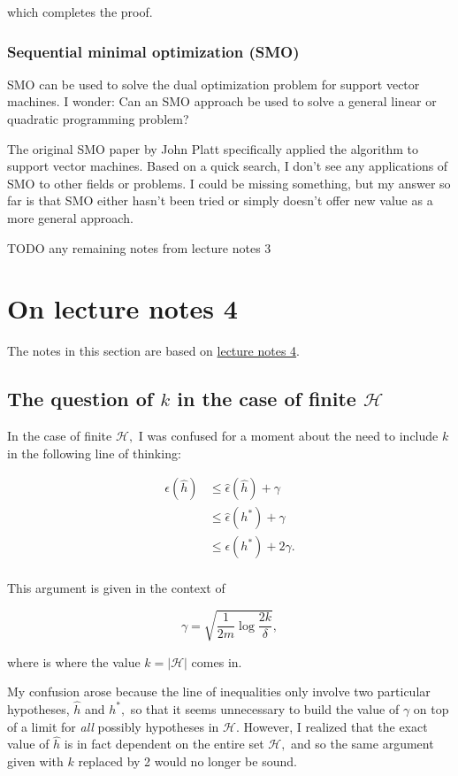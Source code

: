 \documentclass[]{article}
\begin{document}
which completes the proof.

\subsubsection{Sequential minimal optimization
(SMO)}\label{sequential-minimal-optimization-smo}

SMO can be used to solve the dual optimization problem for support
vector machines. I wonder: Can an SMO approach be used to solve a
general linear or quadratic programming problem?

The original SMO paper by John Platt specifically applied the algorithm
to support vector machines. Based on a quick search, I don't see any
applications of SMO to other fields or problems. I could be missing
something, but my answer so far is that SMO either hasn't been tried or
simply doesn't offer new value as a more general approach.

TODO any remaining notes from lecture notes 3

\section{On lecture notes 4}\label{on-lecture-notes-4}

The notes in this section are based on
\href{http://cs229.stanford.edu/notes/cs229-notes4.pdf}{lecture notes
4}.

\subsection{\texorpdfstring{The question of \(k\) in the case of finite
\(\mathcal H\)}{The question of k in the case of finite \textbackslash{}mathcal H}}\label{the-question-of-k-in-the-case-of-finite-mathcal-h}

\newcommand{\eps}{\epsilon}

In the case of finite \(\mathcal H,\) I was confused for a moment about
the need to include \(k\) in the following line of thinking:

\[\begin{aligned}
\eps (\hat h) & \le \hat\eps (\hat h) + \gamma \\
              & \le \hat\eps (h^*) + \gamma \\
              & \le \eps     (h^*) + 2 \gamma. \\
\end{aligned}\]

This argument is given in the context of

\[\gamma = \sqrt{\frac{1}{2m}\log\frac{2k}{\delta}},\]

where is where the value \(k = |\mathcal H|\) comes in.

My confusion arose because the line of inequalities only involve two
particular hypotheses, \(\hat h\) and \(h^*,\) so that it seems
unnecessary to build the value of \(\gamma\) on top of a limit for
\emph{all} possibly hypotheses in \(\mathcal H.\) However, I realized
that the exact value of \(\hat h\) is in fact dependent on the entire
set \(\mathcal H,\) and so the same argument given with \(k\) replaced
by 2 would no longer be sound.

\hypertarget{refs}{}
\end{document}
